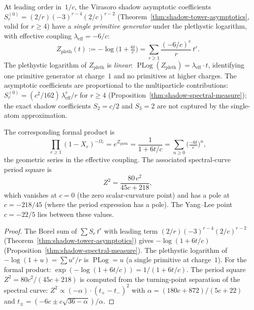\begin{theorem}
\label{thm:shadow-bps}
\ClaimStatusProvedHere
{}
At leading order in~$1/c$, the Virasoro shadow asymptotic coefficients
$S_r^{(0)} = (2/r)(-3)^{r-4}(2/c)^{r-2}$
\textup{(}Theorem~\textup{\ref{thm:shadow-tower-asymptotics}},
valid for $r \ge 4$\textup{)} have a \emph{single primitive generator}
under the plethystic logarithm, with effective coupling
$\lambda_{\mathrm{eff}} = -6/c$:
\begin{equation}\label{eq:shadow-bps}
 Z_{\mathrm{pleth}}(t)
 := -\log\bigl(1 + \tfrac{6t}{c}\bigr)
 = \sum_{r\ge1}
 \frac{(-6/c)^r}{r}\,t^r.
\end{equation}
The plethystic logarithm of $Z_{\mathrm{pleth}}$ is \emph{linear}:
$\operatorname{PLog}(Z_{\mathrm{pleth}}) =
\lambda_{\mathrm{eff}}\cdot t$,
identifying one primitive generator at charge~$1$ and no
primitives at higher charges. The asymptotic coefficients are
proportional to the multiparticle contributions:
$S_r^{(0)} = (c^2/162)\,\lambda_{\mathrm{eff}}^r / r$ for $r \ge 4$
\textup{(}Proposition~\textup{\ref{thm:shadow-spectral-measure}}\textup{)};
the exact shadow coefficients $S_2 = c/2$ and $S_3 = 2$ are not
captured by the single-atom approximation.

The corresponding formal product is
\begin{equation}\label{eq:ks-product}
 \prod_{r\ge1}(1-X_r)^{-\Omega_r}
 = e^{Z_{\mathrm{pleth}}}
 = \frac{1}{1+6t/c}
 = \sum_{n\ge0}\bigl(\tfrac{-6t}{c}\bigr)^n,
\end{equation}
the geometric series in the effective coupling.
The associated spectral-curve period square is
\begin{equation}\label{eq:bps-central-charge}
 Z^2 = \frac{80\,c^2}{45c+218},
\end{equation}
which vanishes at $c = 0$
\textup{(}the zero scalar-curvature point\textup{)}
and has a pole at $c = -218/45$
\textup{(}where the period expression has a pole\textup{)}.
The Yang--Lee point $c = -22/5$ lies between these values.
\end{theorem}

\begin{proof}
The Borel sum of $\sum S_r\,t^r$ with leading term
$(2/r)(-3)^{r-4}(2/c)^{r-2}$
(Theorem~\ref{thm:shadow-tower-asymptotics}) gives
$-\log(1+6t/c)$
(Proposition~\ref{thm:shadow-spectral-measure}).
The plethystic logarithm of $-\log(1+u) =
\sum u^r/r$ is $\operatorname{PLog} = u$
(a single primitive at charge~$1$).
For the formal product:
$\exp(-\log(1+6t/c)) = 1/(1+6t/c)$.
The period square $Z^2 = 80c^2/(45c+218)$
is computed from the turning-point separation of the spectral
curve: $Z^2 \propto (-\alpha)\cdot(t_+ - t_-)^2$
with $\alpha = (180c+872)/(5c+22)$ and
$t_\pm = (-6c \pm c\sqrt{36-\alpha})/\alpha$.
\end{proof}

